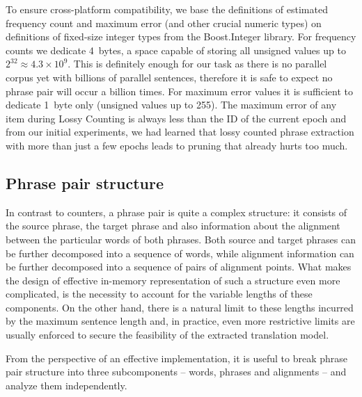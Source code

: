 To ensure cross-platform compatibility, we base the definitions of estimated frequency count and
maximum error (and other crucial numeric types) on definitions of fixed-size integer types from
the Boost.Integer library.
For frequency counts we dedicate 4~bytes, a space capable of storing all unsigned values up to
$2^{32} \approx 4.3 \times 10^9$. This is definitely enough for our task as there is no
parallel corpus yet with billions of parallel sentences, therefore it is safe to expect no phrase
pair will occur a billion times.
For maximum error values it is sufficient to dedicate 1~byte only (unsigned values up to 255).
The maximum error of any item during Lossy Counting is always less than the ID of the current epoch and
from our initial experiments, we had learned that lossy counted phrase extraction with more than just
a few epochs leads to pruning that already hurts too much.

\subsection{Phrase pair structure}


In contrast to counters, a phrase pair is quite a complex structure: it consists of the source phrase,
the target phrase and also information about the alignment between the particular words of both phrases.
Both source and target phrases can be further decomposed into a sequence of words, while alignment
information can be further decomposed into a sequence of pairs of alignment points.
What makes the design of effective in-memory representation of such a structure even more complicated,
is the necessity to account for the variable lengths of these components.
On the other hand, there is a natural limit to these lengths incurred by the maximum sentence length and,
in practice, even more restrictive limits are usually enforced to secure the feasibility of the
extracted translation model.

From the perspective of an effective implementation, it is useful to break phrase pair
structure into three subcomponents -- words, phrases and alignments -- and analyze them
independently.


